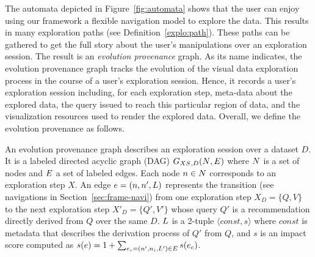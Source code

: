 The automata depicted in Figure~\ref{fig:automata} shows that the user can enjoy using our framework \framework{} a flexible navigation model to explore the data. This results in many exploration paths (see Definition~\ref{explo:path}). These paths can be gathered  to get the full story about the user's manipulations over an exploration session.
The result is an \emph{evolution provenance} graph. As its name indicates, the evolution provenance graph tracks  the evolution of the visual data exploration process in the course of a user's exploration session.
Hence, it records a user's exploration session including, for each exploration step, meta-data about the explored data, the query issued to reach this particular region of data, and the visualization resources used to render the explored data. Overall, we define the evolution provenance as follows.\\

\begin{definition}
\label{def:session}
An evolution provenance graph describes an exploration session over a dataset  $D$.
It is a labeled directed acyclic graph (DAG) $G_{XS}{}_{,D}(N{}, E{})$ where $N{}$ is a set of nodes and $E{}$ a set of labeled edges. 
Each node $n \in N$ corresponds to an exploration step $X$.
An edge $e = (n, n', L{})$ represents the transition (see navigations in Section~\ref{sec:frame-navi}) from one exploration step $X_D = \{Q, V\}$ to the next exploration step $X'_D = \{Q', V'\}$ whose query $Q'$ is a recommendation directly derived from $Q$ over the same $D$. $L{}$ is a 2-tuple $\langle const, s \rangle$ where $const$ is metadata that describes the derivation process of $Q'$ from $Q$, and $s$ is an impact score computed as $s(e) = 1+\sum_{e_c = (n', n_i, L') \in E} s(e_c)$.
\end{definition}	 


